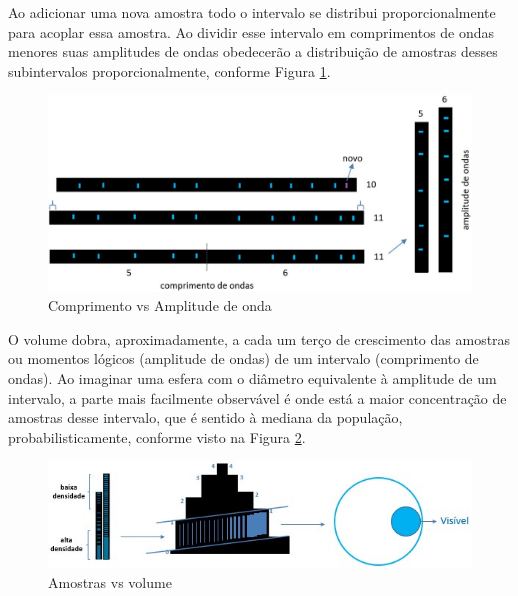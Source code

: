 Ao adicionar uma nova amostra todo o intervalo se distribui proporcionalmente para acoplar essa amostra. Ao dividir esse intervalo em comprimentos de ondas menores suas amplitudes de ondas obedecerão a distribuição de amostras desses subintervalos proporcionalmente, conforme Figura \ref{fig:consciousness_space_volume_amplitude}.
	\begin{figure}[H]
	\caption{Comprimento vs Amplitude de onda}
	\label{fig:consciousness_space_volume_amplitude}
	\centering
	\includegraphics[scale=.4]{sections/images/consciousness_space_volume_amplitude.jpg}
	\end{figure}
	
O volume dobra, aproximadamente, a cada um terço de crescimento das amostras ou momentos lógicos (amplitude de ondas) de um intervalo (comprimento de ondas). Ao imaginar uma esfera com o diâmetro equivalente à amplitude de um intervalo, a parte mais facilmente observável é onde está a maior concentração de amostras desse intervalo, que é sentido à mediana da população, probabilisticamente, conforme visto na Figura \ref{fig:consciousness_space_volume}.
	\begin{figure}[H]
	\caption{Amostras vs volume}
	\label{fig:consciousness_space_volume}
	\centering
	\includegraphics[scale=1]{sections/images/consciousness_space_volume.jpg}
	\end{figure}


